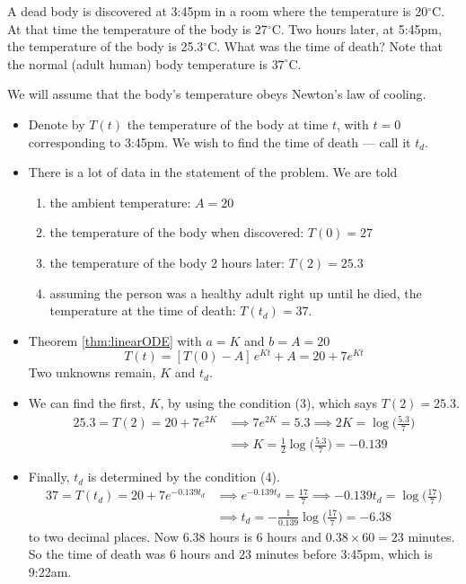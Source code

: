 \begin{eg}\label{eg:SDEcoolingC}
A dead body is discovered at 3:45pm in a room where the temperature
is 20$^\circ$C. At that time the temperature of the
body is 27$^\circ$C.  Two hours later, at 5:45pm, the temperature of the body
is 25.3$^\circ$C. What was the time of death?
Note that the normal (adult human) body temperature is $37^\circ$C.


\soln
We will assume that the body's temperature obeys Newton's law of cooling.
\begin{itemize}
\item
Denote by $T(t)$ the temperature of the body at time $t$, with $t=0$
corresponding to 3:45pm. We wish to find the time of death ---
call it $t_d$.

\item
There is a lot of data in the statement of the problem. We are told
\begin{enumerate}[(1)]
\item the ambient temperature: $A=20$
\item the temperature of the body when discovered: $T(0)=27$
\item the temperature of the body 2 hours later: $T(2)=25.3$
\item assuming the person was a healthy adult right up until he died, the
temperature at the time of death: $T(t_d)=37$.
\end{enumerate}

\item
Theorem \ref{thm:linearODE} with $a=K$ and $b=A=20$
\begin{equation*}
T(t) = [T(0)-A]\,e^{Kt} + A
      =20+7 e^{Kt}
\end{equation*}
Two unknowns remain, $K$ and $t_d$.

\item
We can find the first, $K$, by using the condition (3), which
says $T(2)=25.3$.
\begin{align*}
25.3=T(2) = 20+7 e^{2K}
&\implies 7 e^{2K}=5.3
\implies 2K = \log\big(\tfrac{5.3}{7}\big) \\
&\implies K = \tfrac{1}{2} \log\big(\tfrac{5.3}{7}\big) = -0.139
\end{align*}

\item
Finally, $t_d$ is determined by the condition (4).
\begin{align*}
37 = T(t_d) = 20+7 e^{-0.139 t_d}
&\implies e^{-0.139 t_d} = \tfrac{17}{7}
\implies -0.139 t_d =\log\big(\tfrac{17}{7}\big) \\
&\implies t_d = -\tfrac{1}{0.139}\log\big(\tfrac{17}{7}\big)
 = - 6.38
\end{align*}
to two decimal places.
Now $6.38$ hours is $6$ hours and $0.38\times 60 = 23$ minutes. So the
time of death was $6$ hours and $23$ minutes before 3:45pm, which is
9:22am.
\end{itemize}
\end{eg}


